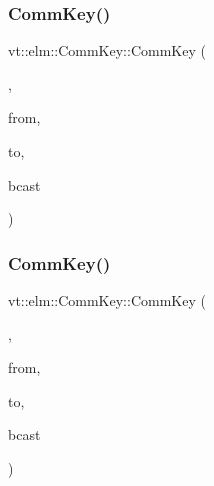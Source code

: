 \subsubsection{\texorpdfstring{Comm\+Key()}{CommKey()}\hspace{0.1cm}{\footnotesize\ttfamily [4/7]}}
{\footnotesize\ttfamily vt\+::elm\+::\+Comm\+Key\+::\+Comm\+Key (\begin{DoxyParamCaption}\item[{\hyperlink{structvt_1_1elm_1_1_comm_key_1_1_send_recv_tag}{Send\+Recv\+Tag}}]{,  }\item[{\hyperlink{structvt_1_1elm_1_1_element_i_d_struct}{Element\+I\+D\+Struct}}]{from,  }\item[{\hyperlink{structvt_1_1elm_1_1_element_i_d_struct}{Element\+I\+D\+Struct}}]{to,  }\item[{bool}]{bcast }\end{DoxyParamCaption})\hspace{0.3cm}{\ttfamily [inline]}}

\mbox{\label{structvt_1_1elm_1_1_comm_key_a2e0ddb556b68ee07656a0885524dfad3}} 
\subsubsection{\texorpdfstring{Comm\+Key()}{CommKey()}\hspace{0.1cm}{\footnotesize\ttfamily [5/7]}}
{\footnotesize\ttfamily vt\+::elm\+::\+Comm\+Key\+::\+Comm\+Key (\begin{DoxyParamCaption}\item[{\hyperlink{structvt_1_1elm_1_1_comm_key_1_1_collection_tag}{Collection\+Tag}}]{,  }\item[{\hyperlink{structvt_1_1elm_1_1_element_i_d_struct}{Element\+I\+D\+Struct}}]{from,  }\item[{\hyperlink{structvt_1_1elm_1_1_element_i_d_struct}{Element\+I\+D\+Struct}}]{to,  }\item[{bool}]{bcast }\end{DoxyParamCaption})\hspace{0.3cm}{\ttfamily [inline]}}

\mbox{\label{structvt_1_1elm_1_1_comm_key_ac8cb57b096ed4d9102166683a2aecb91}} 
